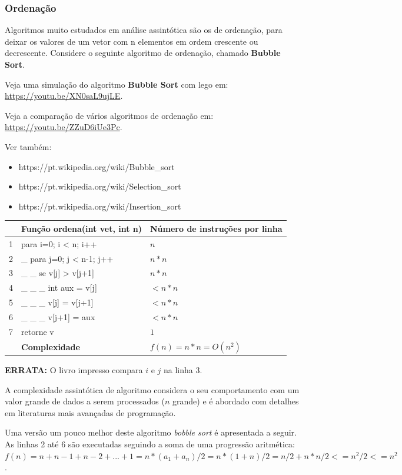 \documentclass[12pt,a4paper]{article}
\begin{document}
    \hypertarget{ordenauxe7uxe3o}{%
\subsubsection{Ordenação}\label{ordenauxe7uxe3o}}

    Algoritmos muito estudados em análise assintótica são os de ordenação,
para deixar os valores de um vetor com n elementos em ordem crescente ou
decrescente. Considere o seguinte algoritmo de ordenação, chamado
\textbf{Bubble Sort}.

Veja uma simulação do algoritmo \textbf{Bubble Sort} com lego em:
\url{https://youtu.be/XN0saL9ujLE}.

Veja a comparação de vários algoritmos de ordenação em:
\url{https://youtu.be/ZZuD6iUe3Pc}.

Ver também:

\begin{itemize}
\item
  https://pt.wikipedia.org/wiki/Bubble\_sort
\item
  https://pt.wikipedia.org/wiki/Selection\_sort
\item
  https://pt.wikipedia.org/wiki/Insertion\_sort
\end{itemize}

    \begin{longtable}[]{@{}lll@{}}
\toprule
& Função ordena(int vet, int n) & Número de instruções por
linha\tabularnewline
\midrule
\endhead
1 & para i=0; i \textless{} n; i++ & \(n\)\tabularnewline
2 & \_ para j=0; j \textless{} n-1; j++ & \(n*n\)\tabularnewline
3 & \_ \_ se v{[}j{]} \textgreater{} v{[}j+1{]} & \(n*n\)\tabularnewline
4 & \_ \_ \_ int aux = v{[}j{]} & \(< n*n\)\tabularnewline
5 & \_ \_ \_ v{[}j{]} = v{[}j+1{]} & \(< n*n\)\tabularnewline
6 & \_ \_ \_ v{[}j+1{]} = aux & \(< n*n\)\tabularnewline
7 & retorne v & \(1\)\tabularnewline
& \textbf{Complexidade} & \(f(n) = n*n = O(n^2)\)\tabularnewline
\bottomrule
\end{longtable}

    \textbf{ERRATA:} O livro impresso compara \(i\) e \(j\) na linha 3.

    A complexidade assintótica de algoritmo considera o seu comportamento
com um valor grande de dados a serem processados (\(n\) grande) e é
abordado com detalhes em literaturas mais avançadas de programação.

    Uma versão um pouco melhor deste algoritmo \emph{bobble sort} é
apresentada a seguir. As linhas 2 até 6 são executadas seguindo a soma
de uma progressão aritmética:
\(f(n) = n+n-1+n-2+...+1 = n*(a_1+a_n)/2 = n*(1+n)/2 = n/2 + n*n/2 <= n^2/2 <= n^2\).
\end{document}
